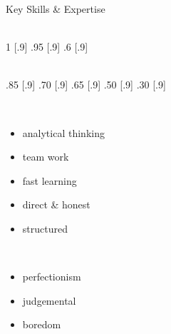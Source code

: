 \begin{frame}[t]{Key Skills \& Expertise}
%
  \vspace*{5mm}
  \begin{minipage}[c][.7\textheight][t]{.29\textwidth}\centering
    \\[2ex]
     {1}   [.9\textwidth]\sg
         {.95} [.9\textwidth]\sg
         {.6}  [.9\textwidth]\sg
  \end{minipage}
%
  \begin{minipage}[c][.7\textheight][t]{.3\textwidth}\centering
    \\[4.3ex]
              {.85} [.9\textwidth]\skg
               {.70} [.9\textwidth]\skg
                 {.65} [.9\textwidth]\skg
             {.50} [.9\textwidth]\skg
                  {.30} [.9\textwidth]
  \end{minipage}
%
  \begin{minipage}[c][.7\textheight][t]{.3\textwidth}\centering
    \\[2ex]
    \begin{itemize}\itemspace{2ex}
      \item analytical thinking
      \item team work
      \item fast learning
      \item direct \& honest
      \item structured\\[4ex]
    \end{itemize}
    \\[2ex]
    \begin{itemize}\itemspace{2ex}
      \item perfectionism
      \item judgemental
      \item boredom
    \end{itemize}
  \end{minipage}
%
\end{frame}
